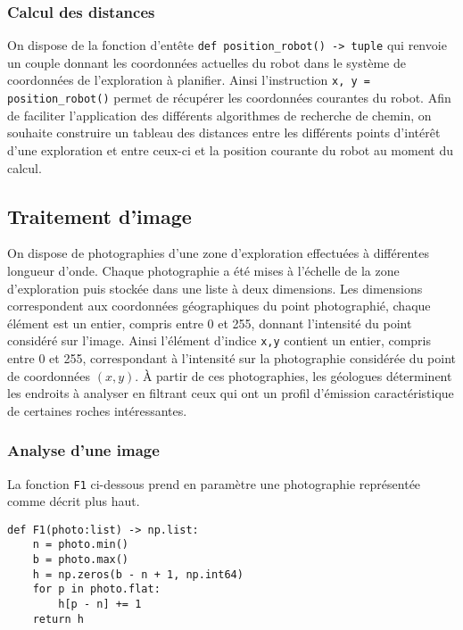 \subsubsection{Calcul des distances}
On dispose de la fonction d’entête \texttt{def position\_robot() -> tuple} qui renvoie un couple donnant les coordonnées actuelles du robot dans le système de coordonnées de l’exploration
à planifier. Ainsi l’instruction \texttt{x, y = position\_robot()} permet de récupérer les coordonnées courantes du
robot.
Afin de faciliter l’application des différents algorithmes de recherche de chemin, on souhaite construire un tableau
des distances entre les différents points d’intérêt d’une exploration et entre ceux-ci et la position courante du
robot au moment du calcul.


\subsection{Traitement d’image}
On dispose de photographies d’une zone d’exploration effectuées à différentes longueur d’onde. Chaque photographie
a été mises à l’échelle de la zone d’exploration puis stockée dans une liste
à deux dimensions. Les dimensions correspondent aux coordonnées géographiques du point photographié, chaque
élément est un entier, compris entre 0 et 255, donnant l’intensité du point considéré sur l’image. Ainsi l’élément
d’indice \texttt{x,y} contient un entier, compris entre 0 et 255, correspondant à l’intensité sur la photographie considérée
du point de coordonnées $(x,y)$. À partir de ces photographies, les géologues déterminent les endroits à analyser
en filtrant ceux qui ont un profil d’émission caractéristique de certaines roches intéressantes.

\subsubsection{Analyse d'une image}
La fonction \texttt{F1} ci-dessous prend en paramètre une photographie représentée comme décrit plus haut. 
\begin{lstlisting}
def F1(photo:list) -> np.list:
    n = photo.min()
    b = photo.max()
    h = np.zeros(b - n + 1, np.int64)
    for p in photo.flat:
        h[p - n] += 1
    return h
\end{lstlisting}

